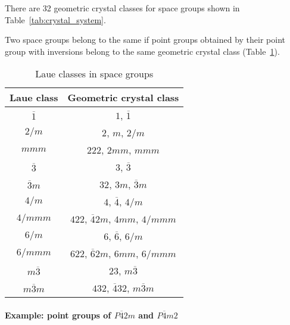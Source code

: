 There are 32 geometric crystal classes for space groups shown in Table~\ref{tab:crystal_system}.

Two space groups belong to the same  if point groups obtained by their point group with inversions belong to the same geometric crystal class (Table~\ref{tab:laue_class}).

\begin{table}[htb]
  \centering
  \caption{Laue classes in space groups}
  \label{tab:laue_class}
  \begin{tabular}[h]{cc}
    \hline\hline
    Laue class       & Geometric crystal class \\ \hline
    $\overline{1}$   & $1$, $\overline{1}$ \\
    $2/m$            & $2$, $m$, $2/m$ \\
    $mmm$            & $222$, $2mm$, $mmm$ \\
    $\overline{3}$   & $3$, $\overline{3}$ \\
    $\overline{3}m$  & $32$, $3m$, $\overline{3}m$ \\
    $4/m$            & $4$, $\overline{4}$, $4/m$ \\
    $4/mmm$          & $422$, $\overline{4}2m$, $4mm$, $4/mmm$ \\
    $6/m$            & $6$, $\overline{6}$, $6/m$ \\
    $6/mmm$          & $622$, $\overline{6}2m$, $6mm$, $6/mmm$ \\
    $m\overline{3}$  & $23$, $m\overline{3}$ \\
    $m\overline{3}m$ & $432$, $\overline{4}32$, $m\overline{3}m$ \\
    \hline\hline
  \end{tabular}
\end{table}

\paragraph{Example: point groups of $P\overline{4}2m$ and $P\overline{4}m2$}

